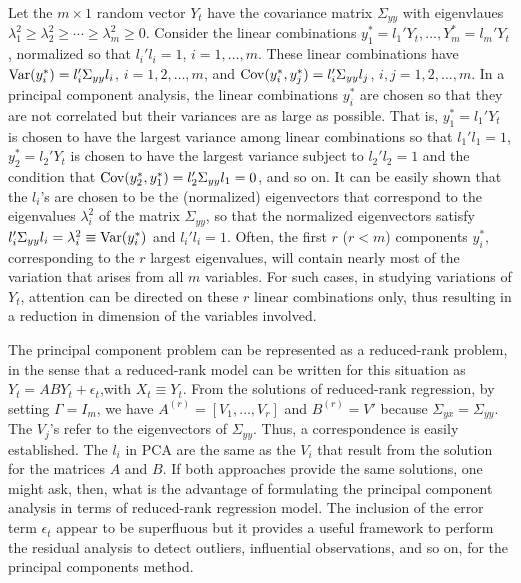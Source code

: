 Let the $m \times 1$ random vector $Y_t$ have the covariance matrix $\Sigma_{yy}$ with eigenvlaues $\lambda_1^2 \geq \lambda_2^2 \geq \cdots \geq \lambda_m^2 \geq 0$. Consider the linear combinations $y_1^*= l_1' Y_t, \ldots, Y_m^* = l_m' Y_t$, normalized so that $l_i' l_i=1$, $i=1, \ldots, m$. These linear combinations have $\operatorname{Var}(y_i^*)= l_i' \Sigma_{yy} l_i$, $i= 1, 2, \ldots, m$, and $\operatorname{Cov}(y_i^*,y_j^*)= l_i' \Sigma_{yy} l_j$, $i,j= 1, 2, \ldots, m$. In a principal component analysis, the linear combinations $y_i^*$ are chosen so that they are not correlated but their variances are as large as possible. That is, $y_1^*= l_1' Y_t$ is chosen to have the largest variance among linear combinations so that $l_1' l_1= 1$, $y_2^*= l_2' Y_t$ is chosen to have the largest variance subject to $l_2' l_2=1$ and the condition that $\operatorname{Cov}(y_2^*,y_1^*)= l_2' \Sigma_{yy}l_1=0$, and so on. It can be easily shown that the $l_i$'s are chosen to be the (normalized) eigenvectors that correspond to the eigenvalues $\lambda_i^2$ of the matrix $\Sigma_{yy}$, so that the normalized eigenvectors satisfy $l_i' \Sigma_{yy}l_i= \lambda_i^2 \equiv \operatorname{Var}(y_i^*)$ and $l_i' l_i=1$. Often, the first $r$ ($r<m$) components $y_i^*$, corresponding to the $r$ largest eigenvalues, will contain nearly most of the variation that arises from all $m$ variables. For such cases, in studying variations of $Y_t$, attention can be directed on these $r$ linear combinations only, thus resulting in a reduction in dimension of the variables involved. 


The principal component problem can be represented as a reduced-rank problem, in the sense that a reduced-rank model can be written for this situation as $Y_t= ABY_t + \epsilon_t$,with $X_t \equiv Y_t$. From the solutions of reduced-rank regression, by setting $\Gamma= I_m$, we have $A^{(r)}= [V_1, \ldots, V_r]$ and $B^{(r)}= V'$ because $\Sigma_{yx}= \Sigma_{yy}$. The $V_j$'s refer to the eigenvectors of $\Sigma_{yy}$. Thus, a correspondence is easily established. The $l_i$ in PCA are the same as the $V_i$ that result from the solution for the matrices $A$ and $B$. If both approaches provide the same solutions, one might ask, then, what is the advantage of formulating the principal component analysis in terms of reduced-rank regression model. The inclusion of the error term $\epsilon_t$ appear to be superfluous but it provides a useful framework to perform the residual analysis to detect outliers, influential observations, and so on, for the principal components method. \label{in:dimred2} \twomedskip


